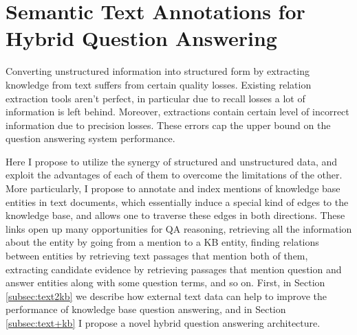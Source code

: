 



\section{Semantic Text Annotations for Hybrid Question Answering}
\label{sec:text+kb}

Converting unstructured information into structured form by extracting knowledge from text suffers from certain quality losses.
Existing relation extraction tools aren't perfect, in particular due to recall losses a lot of information is left behind.
Moreover, extractions contain certain level of incorrect information due to precision losses.
These errors cap the upper bound on the question answering system performance.

Here I propose to utilize the synergy of structured and unstructured data, and exploit the advantages of each of them to overcome the limitations of the other.
More particularly, I propose to annotate and index mentions of knowledge base entities in text documents, which essentially induce a special kind of edges to the knowledge base, and allows one to traverse these edges in both directions.
These links open up many opportunities for QA reasoning, \eg retrieving all the information about the entity by going from a mention to a KB entity, finding relations between entities by retrieving text passages that mention both of them, extracting candidate evidence by retrieving passages that mention question and answer entities along with some question terms, and so on.
First, in Section \ref{subsec:text2kb} we describe how external text data can help to improve the performance of knowledge base question answering, and in Section \ref{subsec:text+kb} I propose a novel hybrid question answering architecture.

